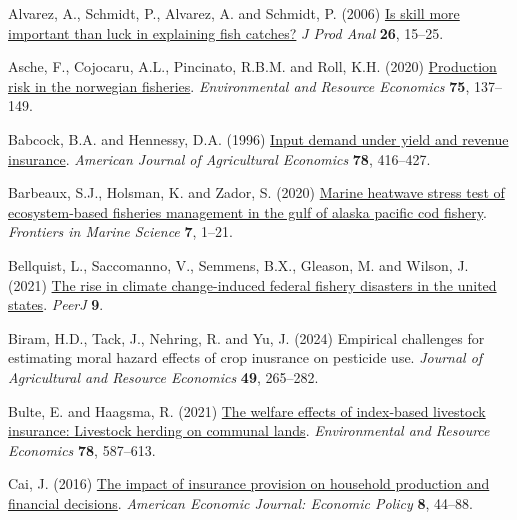 \documentclass[
  letterpaper,
  DIV=11,
  numbers=noendperiod]{scrartcl}
\newlength{\cslhangindent}
\newlength{\cslentryspacingunit} %
\newenvironment{CSLReferences}[2] %
 {%
  \setlength{\parindent}{0pt}
  \ifodd #1
  \let\oldpar\par
  \def\par{\hangindent=\cslhangindent\oldpar}
  \fi
  \setlength{\parskip}{#2\cslentryspacingunit}
 }%
 {}
\theoremstyle{plain}
\theoremstyle{plain}
\theoremstyle{remark}
\begin{document}
\hypertarget{refs}{}
\begin{CSLReferences}{1}{0}
\leavevmode{}%
Alvarez, A., Schmidt, P., Alvarez, A. and Schmidt, P. (2006)
\href{https://doi.org/10.1007/s11123-006-0002-x}{Is skill more important
than luck in explaining fish catches?} \emph{J Prod Anal} \textbf{26},
15--25.

\leavevmode{}%
Asche, F., Cojocaru, A.L., Pincinato, R.B.M. and Roll, K.H. (2020)
\href{https://doi.org/10.1007/s10640-019-00391-2}{Production risk in the
norwegian fisheries}. \emph{Environmental and Resource Economics}
\textbf{75}, 137--149.

\leavevmode{}%
Babcock, B.A. and Hennessy, D.A. (1996)
\href{https://doi.org/10.2307/1243713}{Input demand under yield and
revenue insurance}. \emph{American Journal of Agricultural Economics}
\textbf{78}, 416--427.

\leavevmode{}%
Barbeaux, S.J., Holsman, K. and Zador, S. (2020)
\href{https://doi.org/10.3389/fmars.2020.00703}{Marine heatwave stress
test of ecosystem-based fisheries management in the gulf of alaska
pacific cod fishery}. \emph{Frontiers in Marine Science} \textbf{7},
1--21.

\leavevmode{}%
Bellquist, L., Saccomanno, V., Semmens, B.X., Gleason, M. and Wilson, J.
(2021) \href{https://doi.org/10.7717/peerj.11186}{The rise in climate
change-induced federal fishery disasters in the united states}.
\emph{PeerJ} \textbf{9}.

\leavevmode{}%
Biram, H.D., Tack, J., Nehring, R. and Yu, J. (2024) Empirical
challenges for estimating moral hazard effects of crop inusrance on
pesticide use. \emph{Journal of Agricultural and Resource Economics}
\textbf{49}, 265--282.

\leavevmode{}%
Bulte, E. and Haagsma, R. (2021)
\href{https://doi.org/10.1007/s10640-021-00545-1}{The welfare effects of
index-based livestock insurance: Livestock herding on communal lands}.
\emph{Environmental and Resource Economics} \textbf{78}, 587--613.

\leavevmode{}%
Cai, J. (2016) \href{https://doi.org/10.1257/pol.20130371}{The impact of
insurance provision on household production and financial decisions}.
\emph{American Economic Journal: Economic Policy} \textbf{8}, 44--88.


\end{CSLReferences}
\end{document}
